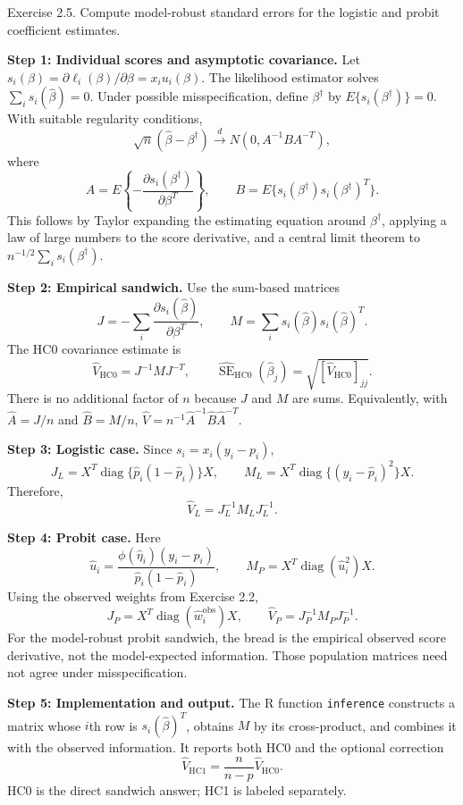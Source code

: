 \documentclass[answers,12pt,addpoints]{exam}
\begin{document}
\begin{questions}
\question Exercise 2.5. Compute model-robust standard errors for the
logistic and probit coefficient estimates.
\begin{solution}
\textbf{Step 1: Individual scores and asymptotic covariance.}
Let $s_i(\beta)=\partial\ell_i(\beta)/\partial\beta=x_iu_i(\beta)$.
The likelihood estimator solves $\sum_i s_i(\widehat\beta)=0$.
Under possible misspecification, define $\beta^\dagger$ by
$E\{s_i(\beta^\dagger)\}=0$. With suitable regularity conditions,
\[
\sqrt n(\widehat\beta-\beta^\dagger)
\overset{d}{\longrightarrow}N(0,A^{-1}BA^{-T}),
\]
where
\[
A=E\left\{-\frac{\partial s_i(\beta^\dagger)}{\partial\beta^T}\right\},
\qquad B=E\{s_i(\beta^\dagger)s_i(\beta^\dagger)^T\}.
\]
This follows by Taylor expanding the estimating equation around
$\beta^\dagger$, applying a law of large numbers to the score derivative,
and a central limit theorem to $n^{-1/2}\sum_i s_i(\beta^\dagger)$.

\textbf{Step 2: Empirical sandwich.}
Use the sum-based matrices
\[
J=-\sum_i\frac{\partial s_i(\widehat\beta)}{\partial\beta^T},
\qquad M=\sum_i s_i(\widehat\beta)s_i(\widehat\beta)^T.
\]
The HC0 covariance estimate is
\[
\boxed{\widehat V_{\mathrm{HC0}}=J^{-1}MJ^{-T},\qquad
\widehat{\operatorname{SE}}_{\mathrm{HC0}}(\widehat\beta_j)
=\sqrt{[\widehat V_{\mathrm{HC0}}]_{jj}}.}
\]
There is no additional factor of $n$ because $J$ and $M$ are sums.
Equivalently, with $\widehat A=J/n$ and $\widehat B=M/n$,
$\widehat V=n^{-1}\widehat A^{-1}\widehat B\widehat A^{-T}$.

\textbf{Step 3: Logistic case.}
Since $s_i=x_i(y_i-p_i)$,
\[
J_L=X^T\operatorname{diag}\{\widehat p_i(1-\widehat p_i)\}X,
\qquad
M_L=X^T\operatorname{diag}\{(y_i-\widehat p_i)^2\}X.
\]
Therefore,
\[
\boxed{\widehat V_L=J_L^{-1}M_LJ_L^{-1}.}
\]

\textbf{Step 4: Probit case.}
Here
\[
\widehat u_i=\frac{\phi(\widehat\eta_i)(y_i-\widehat p_i)}
{\widehat p_i(1-\widehat p_i)},\qquad
M_P=X^T\operatorname{diag}(\widehat u_i^2)X.
\]
Using the observed weights from Exercise 2.2,
\[
J_P=X^T\operatorname{diag}(\widehat w_i^{\mathrm{obs}})X,
\qquad
\boxed{\widehat V_P=J_P^{-1}M_PJ_P^{-1}.}
\]
For the model-robust probit sandwich, the bread is the empirical observed
score derivative, not the model-expected information. Those population
matrices need not agree under misspecification.

\textbf{Step 5: Implementation and output.}
The R function \texttt{inference} constructs a matrix whose $i$th row is
$s_i(\widehat\beta)^T$, obtains $M$ by its cross-product, and combines it
with the observed information. It reports both HC0 and the optional correction
\[
\widehat V_{\mathrm{HC1}}=\frac{n}{n-p}\widehat V_{\mathrm{HC0}}.
\]
HC0 is the direct sandwich answer; HC1 is labeled separately.


\end{solution}
\end{questions}
\end{document}

